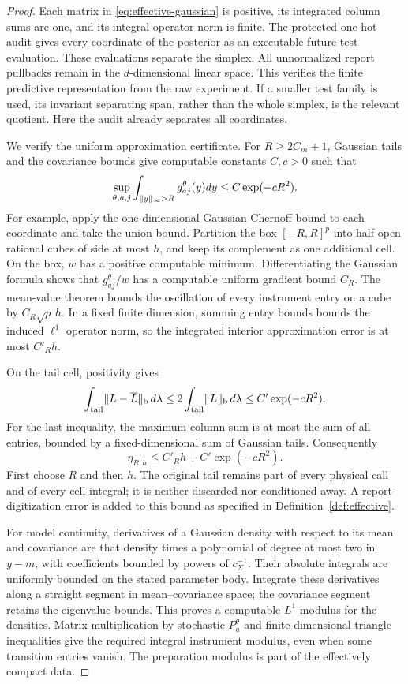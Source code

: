 \begin{proof}
Each matrix in \eqref{eq:effective-gaussian} is positive, its integrated column sums are one, and its integral operator norm is finite. The protected one-hot audit gives every coordinate of the posterior as an executable future-test evaluation. These evaluations separate the simplex. All unnormalized report pullbacks remain in the $d$-dimensional linear space. This verifies the finite predictive representation from the raw experiment. If a smaller test family is used, its invariant separating span, rather than the whole simplex, is the relevant quotient. Here the audit already separates all coordinates.

We verify the uniform approximation certificate. For $R\ge2C_m+1$, Gaussian tails and the covariance bounds give computable constants $C,c>0$ such that
\begin{equation}\label{eq:gaussian-tail-compile}
 \sup_{\theta,a,j}\int_{\lVert y\rVert_\infty>R}g_{aj}^\theta(y)dy
        \le C\exp(-cR^2).
\end{equation}
For example, apply the one-dimensional Gaussian Chernoff bound to each coordinate and take the union bound. Partition the box $[-R,R]^p$ into half-open rational cubes of side at most $h$, and keep its complement as one additional cell. On the box, $w$ has a positive computable minimum. Differentiating the Gaussian formula shows that $g_{aj}^\theta/w$ has a computable uniform gradient bound $C_R$. The mean-value theorem bounds the oscillation of every instrument entry on a cube by $C_R\sqrt p\,h$. In a fixed finite dimension, summing entry bounds bounds the induced $\ell^1$ operator norm, so the integrated interior approximation error is at most $C'_Rh$.

On the tail cell, positivity gives
\[
 \int_{\mathrm{tail}}\lVert L-\overline L\rVert_{\mathrm b}\,d\lambda
    \le2\int_{\mathrm{tail}}\lVert L\rVert_{\mathrm b}\,d\lambda
    \le C'\exp(-cR^2).
\]
For the last inequality, the maximum column sum is at most the sum of all entries, bounded by a fixed-dimensional sum of Gaussian tails. Consequently
\begin{equation}\label{eq:gaussian-partition-modulus}
 \eta_{R,h}\le C'_Rh+C'\exp(-cR^2).
\end{equation}
First choose $R$ and then $h$. The original tail remains part of every physical call and of every cell integral; it is neither discarded nor conditioned away. A report-digitization error is added to this bound as specified in Definition~\ref{def:effective}.

For model continuity, derivatives of a Gaussian density with respect to its mean and covariance are that density times a polynomial of degree at most two in $y-m$, with coefficients bounded by powers of $c_\Sigma^{-1}$. Their absolute integrals are uniformly bounded on the stated parameter body. Integrate these derivatives along a straight segment in mean--covariance space; the covariance segment retains the eigenvalue bounds. This proves a computable $L^1$ modulus for the densities. Matrix multiplication by stochastic $P_a^\theta$ and finite-dimensional triangle inequalities give the required integral instrument modulus, even when some transition entries vanish. The preparation modulus is part of the effectively compact data.


\end{proof}
